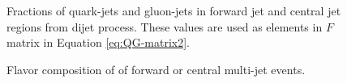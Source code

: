 \begin{figure}[htb]
	\centering
	\quad
	\caption[]{
		Fractions of quark-jets and gluon-jets  %
		in forward jet and central jet regions from {\pythia} dijet process. These values are used as elements in $F$ matrix in Equation \ref{eq:QG-matrix2}. %
		\label{fig:QG-Fmc}
	}
\end{figure}

\begin{figure}[htb]
	\centering
	 \quad
	 \quad
	\caption[]{
		Flavor composition of of forward   or central   multi-jet events. %
		\label{fig:QG-quark-fraction}
	}
\end{figure}


